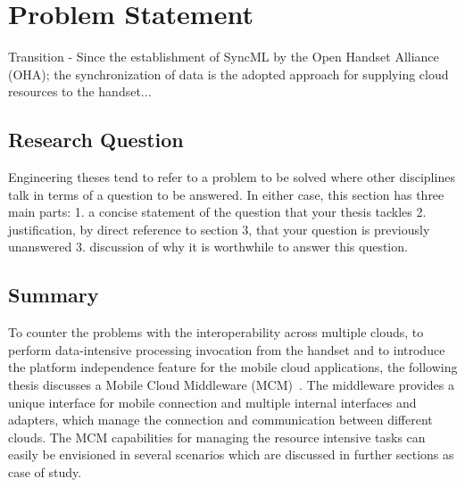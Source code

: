 
\chapter{Problem Statement} %


Transition - Since the establishment of SyncML by the Open Handset Alliance (OHA); the synchronization of data is the adopted approach for supplying cloud resources to the handset... 




\ifpdf
    \graphicspath{{X/figures/PNG/}{X/figures/PDF/}{X/figures/}}
\else
    \graphicspath{{X/figures/EPS/}{X/figures/}}
\fi


\section{Research Question}
Engineering theses tend to refer to a problem to be solved where other disciplines talk in terms of a question to be answered. In either case, this section has three main parts: 
1. a concise statement of the question that your thesis tackles 
2. justification, by direct reference to section 3, that your question is previously unanswered
3. discussion of why it is worthwhile to answer this question. 




\section{Summary}
To counter the problems with the interoperability across multiple clouds, to perform data-intensive processing invocation from the handset and to introduce the platform independence feature for the mobile cloud applications, the following thesis discusses a Mobile Cloud Middleware (MCM)~\cite{chen2000survey}. The middleware provides a unique interface for mobile connection and multiple internal interfaces and adapters, which manage the connection and communication between different clouds. The MCM capabilities for managing the resource intensive tasks can easily be envisioned in several scenarios which are discussed in further sections as case of study. 






